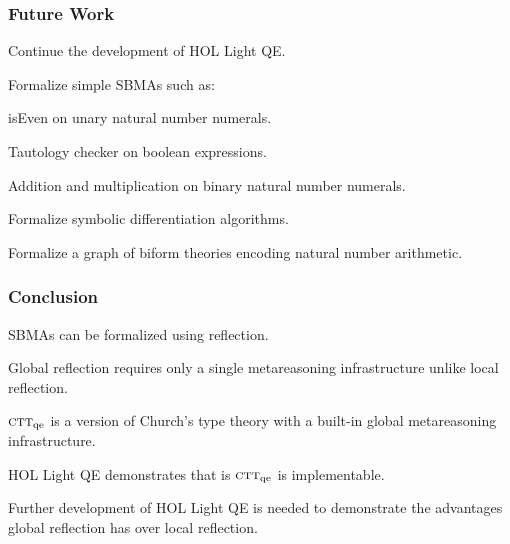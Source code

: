 \documentclass[t,12pt,numbers,fleqn]{beamer}
\newcommand{\churchqe}{$\mbox{\sc ctt}_{\rm qe}$}
\begin{document}
\begin{frame}
\frametitle{Future Work}
\bi

  \item Continue the development of HOL Light QE.

  \item Formalize simple SBMAs such as:

  \bi

    \item isEven on unary natural number numerals.

    \item Tautology checker on boolean expressions.

    \item Addition and multiplication on binary natural number
      numerals.

  \ei

  \item Formalize symbolic differentiation algorithms.

  \item Formalize a graph of biform theories encoding natural number
    arithmetic.

\ei
\end{frame}


\begin{frame}
\frametitle{Conclusion}
\be

  \item SBMAs can be formalized using reflection.

  \item Global reflection requires only a single metareasoning
    infrastructure unlike local reflection.

  \item {\churchqe} is a version of Church's type theory with a
    built-in global metareasoning infrastructure.

  \item HOL Light QE demonstrates that is {\churchqe} is
    implementable.

  \item Further development of HOL Light QE is needed to demonstrate
    the advantages global reflection has over local reflection.

\ee
\end{frame}

\end{document}
